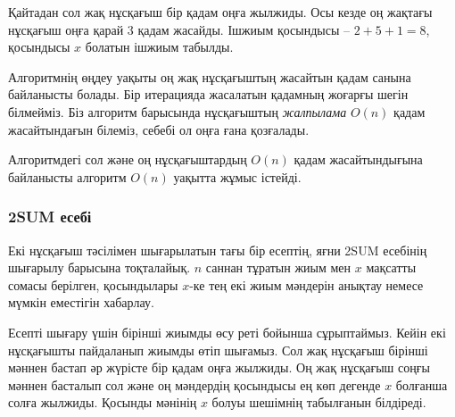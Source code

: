 Қайтадан сол жақ нұсқағыш бір қадам оңға жылжиды. Осы кезде
оң жақтағы нұсқағыш оңға қарай 3 қадам жасайды. Ішжиым қосындысы -- $2+5+1=8$,
қосындысы $x$ болатын ішжиым табылды.

\begin{center}
\end{center}

Алгоритмнің өңдеу уақыты оң жақ нұсқағыштың жасайтын қадам санына байланысты болады.
Бір итерацияда жасалатын қадамның жоғарғы шегін білмейміз. 
Біз алгоритм барысында нұсқағыштың \emph{жалпылама} $O(n)$ қадам жасайтындағын білеміз,
себебі ол оңға ғана қозғалады.

Алгоритмдегі сол және оң нұсқағыштардың $O(n)$
қадам жасайтындығына байланысты алгоритм $O(n)$ уақытта жұмыс істейді.

\subsubsection{2SUM есебі}


Екі нұсқағыш тәсілімен шығарылатын тағы бір есептің, яғни 2SUM есебінің шығарылу барысына тоқталайық.  
$n$ саннан тұратын жиым мен $x$ мақсатты сомасы берілген,
қосындылары $x$-ке тең екі жиым мәндерін анықтау немесе мүмкін еместігін хабарлау.

Есепті шығару үшін бірінші жиымды өсу реті бойынша сұрыптаймыз.
Кейін екі нұсқағышты пайдаланып жиымды өтіп шығамыз.
Сол жақ нұсқағыш бірінші мәннен бастап әр жүрісте бір қадам оңға жылжиды.
Оң жақ нұсқағыш соңғы мәннен басталып сол және оң мәндердің қосындысы ең көп дегенде $x$ болғанша
солға жылжиды.
Қосынды мәнінің $x$ болуы шешімнің табылғанын білдіреді.

